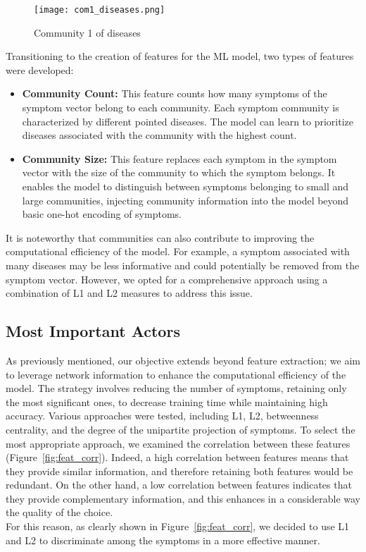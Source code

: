 \begin{figure}[H]
    \centering
    \texttt{[image: com1\_diseases.png]}
    \caption{Community 1 of diseases}
    \label{fig:com1_diseases}
\end{figure}
\noindent
Transitioning to the creation of features for the ML model, two types of features were developed:\\

\begin{itemize}
    \setlength\itemsep{1em} %

    \item \textbf{Community Count:} This feature counts how many symptoms of the symptom vector belong to each community.
          Each symptom community is characterized by different pointed diseases. The model can learn to prioritize
          diseases associated with the community with the highest count.

    \item \textbf{Community Size:} This feature replaces each symptom in the symptom vector with the size of the
          community to which the symptom belongs. It enables the model to distinguish between symptoms belonging to small and
          large communities, injecting community information into the model beyond basic one-hot encoding of symptoms.
\end{itemize}
\noindent
It is noteworthy that communities can also contribute to improving the computational efficiency of the model.
For example, a symptom associated with many diseases may be less informative and could potentially be removed from the
symptom vector. However, we opted for a comprehensive approach using a combination of L1 and L2 measures to address this issue.


\subsection{Most Important Actors}
\label{subsec:most_important_actors}

As previously mentioned, our objective extends beyond feature extraction; we aim to leverage network information to
enhance the computational efficiency of the model. The strategy involves reducing the number of symptoms,
retaining only the most significant ones, to decrease training time while maintaining high accuracy.
Various approaches were tested, including L1, L2, betweenness centrality, and the degree of the unipartite projection
of symptoms. To select the most appropriate approach, we examined the correlation between these features
(Figure~\ref{fig:feat_corr}). Indeed, a high correlation between features means that they provide
similar information, and therefore retaining both features would be redundant. On the other hand,
a low correlation between features indicates that they provide complementary information, and this enhances
in a considerable way the quality of the choice.\\
For this reason, as clearly shown in Figure~\ref{fig:feat_corr}, we decided to use L1 and L2 to discriminate
among the symptoms in a more effective manner.

